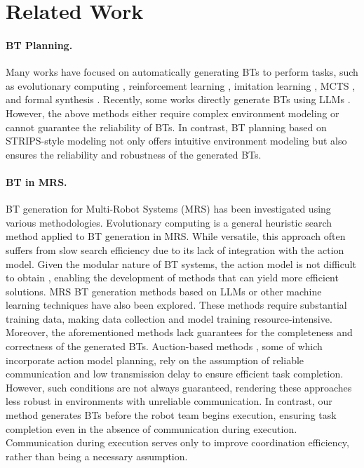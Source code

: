 \section{Related Work}
\paragraph{BT Planning.}
Many works have focused on automatically generating BTs to perform tasks, such as evolutionary computing \cite{neupane2019learning,colledanchise2019learning,lim2010evolving}, reinforcement learning \cite{banerjee2018autonomous,pereira2015framework}, imitation learning \cite{french2019learning}, MCTS \cite{scheide2021behavior}, and formal synthesis \cite{li2021reactive,tadewos2022specificationguided,neupane2023designing}. Recently, some works directly generate BTs using LLMs \cite{lykov2023llmbrain,lykov2023llmmars}. However, the above methods either require complex environment modeling or cannot guarantee the reliability of BTs. In contrast, BT planning \cite{cai2021bt,chen2024integrating} based on STRIPS-style modeling \cite{fikes1971strips} not only offers intuitive environment modeling but also ensures the reliability and robustness of the generated BTs. 



\paragraph{BT in MRS.}
BT generation for Multi-Robot Systems (MRS) has been investigated using various methodologies. Evolutionary computing \cite{neupane2019learning} is a general heuristic search method applied to BT generation in MRS. While versatile, this approach often suffers from slow search efficiency due to its lack of integration with the action model. Given the modular nature of BT systems, the action model is not difficult to obtain \cite{arora2018review}, enabling the development of methods that can yield more efficient solutions. MRS BT generation methods based on LLMs \cite{lykov2023llmmars} or other machine learning techniques \cite{fu2016reinforcement} have also been explored. These methods require substantial training data, making data collection and model training resource-intensive. Moreover, the aforementioned methods lack guarantees for the completeness and correctness of the generated BTs. Auction-based methods \cite{dahlquist2023reactive,heppner2024behavior,colledanchise2016advantages}, some of which incorporate action model planning, rely on the assumption of reliable communication and low transmission delay to ensure efficient task completion. However, such conditions are not always guaranteed, rendering these approaches less robust in environments with unreliable communication. In contrast, our method generates BTs before the robot team begins execution, ensuring task completion even in the absence of communication during execution. Communication during execution serves only to improve coordination efficiency, rather than being a necessary assumption.



